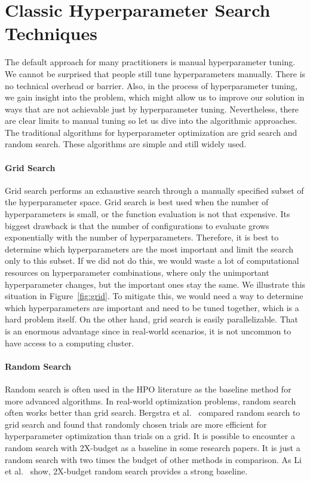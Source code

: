 \section{Classic Hyperparameter Search Techniques}
The default approach for many practitioners is manual hyperparameter tuning. We cannot be surprised that people still tune hyperparameters manually. There is no technical overhead or barrier. Also, in the process of hyperparameter tuning, we gain insight into the problem, which might allow us to improve our solution in ways that are not achievable just by hyperparameter tuning. Nevertheless, there are clear limits to manual tuning so let us dive into the algorithmic approaches. The traditional algorithms for hyperparameter optimization are grid search and random search. These algorithms are simple and still widely used.

\paragraph{Grid Search} Grid search performs an exhaustive search through a manually specified subset of the hyperparameter space. Grid search is best used when the number of hyperparameters is small, or the function evaluation is not that expensive. Its biggest drawback is that the number of configurations to evaluate grows exponentially with the number of hyperparameters. Therefore, it is best to determine which hyperparameters are the most important and limit the search only to this subset. If we did not do this, we would waste a lot of computational resources on hyperparameter combinations, where only the unimportant hyperparameter changes, but the important ones stay the same. We illustrate this situation in Figure~\ref{fig:grid}. To mitigate this, we would need a way to determine which hyperparameters are important and need to be tuned together, which is a hard problem itself. On the other hand, grid search is easily parallelizable. That is an enormous advantage since in real-world scenarios, it is not uncommon to have access to a computing cluster.

\paragraph{Random Search} Random search is often used in the HPO literature as the baseline method for more advanced algorithms. In real-world optimization problems, random search often works better than grid search. Bergstra et al.~\cite{bergstra2012random} compared random search to grid search and found that randomly chosen trials are more efficient for hyperparameter optimization than trials on a grid. It is possible to encounter a random search with 2X-budget as a baseline in some research papers. It is just a random search with two times the budget of other methods in comparison. As Li et al.~\cite{li2018hyperband} show, 2X-budget random search provides a strong baseline.

